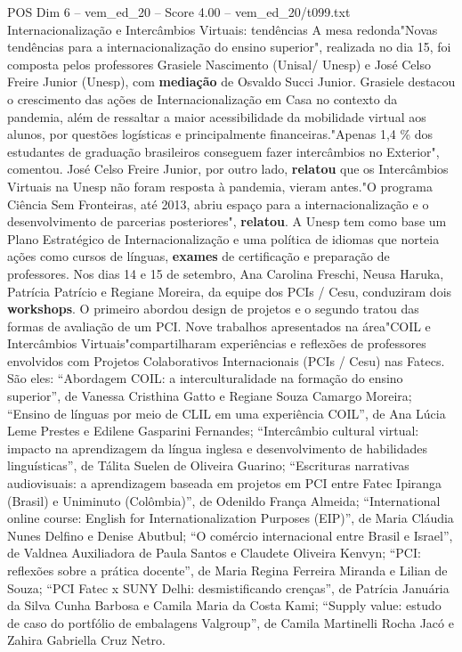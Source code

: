\begin{textsample}{POS Dim 6 – vem\_ed\_20 – Score 4.00 – vem\_ed\_20/t099.txt}  \label{ex:f6_pos_029}
Internacionalização e Intercâmbios Virtuais: tendências A mesa redonda"Novas tendências para a internacionalização do ensino superior", realizada no dia 15, foi composta pelos professores Grasiele Nascimento (Unisal/ Unesp) e José Celso Freire Junior (Unesp), com \textbf{mediação} de Osvaldo Succi Junior.
Grasiele destacou o crescimento das ações de Internacionalização em Casa no contexto da pandemia, além de ressaltar a maior acessibilidade da mobilidade virtual aos alunos, por questões logísticas e principalmente financeiras."Apenas 1,4 \% dos estudantes de graduação brasileiros conseguem fazer intercâmbios no Exterior", comentou.
José Celso Freire Junior, por outro lado, \textbf{relatou} que os Intercâmbios Virtuais na Unesp não foram resposta à pandemia, vieram antes."O programa Ciência Sem Fronteiras, até 2013, abriu espaço para a internacionalização e o desenvolvimento de parcerias posteriores", \textbf{relatou}.
A Unesp tem como base um Plano Estratégico de Internacionalização e uma política de idiomas que norteia ações como cursos de línguas, \textbf{exames} de certificação e preparação de professores.
Nos dias 14 e 15 de setembro, Ana Carolina Freschi, Neusa Haruka, Patrícia Patrício e Regiane Moreira, da equipe dos PCIs / Cesu, conduziram dois \textbf{workshops}.
O primeiro abordou design de projetos e o segundo tratou das formas de avaliação de um PCI.
Nove trabalhos apresentados na área"COIL e Intercâmbios Virtuais"compartilharam experiências e reflexões de professores envolvidos com Projetos Colaborativos Internacionais (PCIs / Cesu) nas Fatecs.
São eles: “Abordagem COIL: a interculturalidade na formação do ensino superior”, de Vanessa Cristhina Gatto e Regiane Souza Camargo Moreira; “Ensino de línguas por meio de CLIL em uma experiência COIL”, de Ana Lúcia Leme Prestes e Edilene Gasparini Fernandes; “Intercâmbio cultural virtual: impacto na aprendizagem da língua inglesa e desenvolvimento de habilidades linguísticas”, de Tálita Suelen de Oliveira Guarino; “Escrituras narrativas audiovisuais: a aprendizagem baseada em projetos em PCI entre Fatec Ipiranga (Brasil) e Uniminuto (Colômbia)”, de Odenildo França Almeida; “International online course: English for Internationalization Purposes (EIP)”, de Maria Cláudia Nunes Delfino e Denise Abutbul; “O comércio internacional entre Brasil e Israel”, de Valdnea Auxiliadora de Paula Santos e Claudete Oliveira Kenvyn; “PCI: reflexões sobre a prática docente”, de Maria Regina Ferreira Miranda e Lilian de Souza; “PCI Fatec x SUNY Delhi: desmistificando crenças”, de Patrícia Januária da Silva Cunha Barbosa e Camila Maria da Costa Kami; “Supply value: estudo de caso do portfólio de embalagens Valgroup”, de Camila Martinelli Rocha Jacó e Zahira Gabriella Cruz Netro.

\end{textsample}
